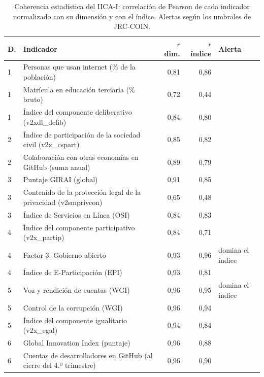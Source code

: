 \begin{table}[htbp]\centering\scriptsize
\caption{Coherencia estadística del IICA-I: correlación de Pearson de cada indicador normalizado con su dimensión y con el índice. Alertas según los umbrales de JRC-COIN.}\label{tab:coh-intl}
\begin{tabular}{@{}p{0.4cm}>{\raggedright\arraybackslash}p{6.0cm}rr>{\raggedright\arraybackslash}p{2.6cm}@{}}
\toprule
D. & Indicador & $r$ dim. & $r$ índice & Alerta\\
\midrule
1 & Personas que usan internet (\% de la población) & 0{,}81 & 0{,}86 & \\
1 & Matrícula en educación terciaria (\% bruto) & 0{,}72 & 0{,}44 & \\
1 & Índice del componente deliberativo (v2xdl\_delib) & 0{,}84 & 0{,}80 & \\
2 & Índice de participación de la sociedad civil (v2x\_cspart) & 0{,}85 & 0{,}82 & \\
2 & Colaboración con otras economías en GitHub (suma anual) & 0{,}89 & 0{,}79 & \\
3 & Puntaje GIRAI (global) & 0{,}91 & 0{,}85 & \\
3 & Contenido de la protección legal de la privacidad (v2smprivcon) & 0{,}65 & 0{,}48 & \\
3 & Índice de Servicios en Línea (OSI) & 0{,}84 & 0{,}83 & \\
4 & Índice del componente participativo (v2x\_partip) & 0{,}84 & 0{,}71 & \\
4 & Factor 3: Gobierno abierto & 0{,}93 & 0{,}96 & domina el índice\\
4 & Índice de E-Participación (EPI) & 0{,}93 & 0{,}81 & \\
5 & Voz y rendición de cuentas (WGI) & 0{,}96 & 0{,}95 & domina el índice\\
5 & Control de la corrupción (WGI) & 0{,}96 & 0{,}94 & \\
5 & Índice del componente igualitario (v2x\_egal) & 0{,}94 & 0{,}84 & \\
6 & Global Innovation Index (puntaje) & 0{,}96 & 0{,}88 & \\
6 & Cuentas de desarrolladores en GitHub (al cierre del 4.º trimestre) & 0{,}96 & 0{,}90 & \\
\bottomrule
\end{tabular}
\end{table}
